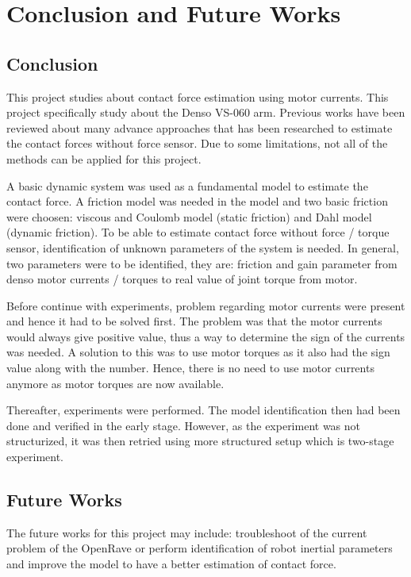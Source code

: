 \chapter{Conclusion and Future Works}
\section{Conclusion}
This project studies about contact force estimation using motor currents. This project specifically study about the Denso VS-060 arm. Previous works have been reviewed about many advance approaches that has been researched to estimate the contact forces without force sensor. Due to some limitations, not all of the methods can be applied for this project. 

A basic dynamic system was used as a fundamental model to estimate the contact force. A friction model was needed in the model and two basic friction were choosen: viscous and Coulomb model (static friction) and Dahl model (dynamic friction). To be able to estimate contact force without force / torque sensor, identification of unknown parameters of the system is needed. In general, two parameters were to be identified, they are: friction and gain parameter from denso motor currents / torques to real value of joint torque from motor. 

Before continue with experiments, problem regarding motor currents were present and hence it had to be solved first. The problem was that the motor currents would always give positive value, thus a way to determine the sign of the currents was needed. A solution to this was to use motor torques as it also had the sign value along with the number. Hence, there is no need to use motor currents anymore as motor torques are now available. 

Thereafter, experiments were performed. The model identification then had been done and verified in the early stage. However, as the experiment was not structurized, it was then retried using more structured setup which is two-stage experiment. 



\section{Future Works}
The future works for this project may include: troubleshoot of the current problem of the OpenRave or perform identification of robot inertial parameters and improve the model to have a better estimation of contact force.


